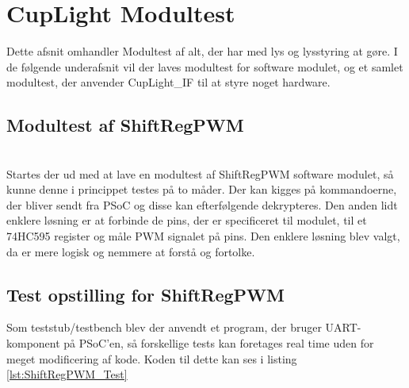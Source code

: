 \documentclass[Modultest/Modultest_main.tex]{subfiles}
\begin{document}

\lstset{escapechar=@,style=customc}

\section{CupLight Modultest}
\begin{table}[H]
\centering
{}
\caption{Versions Historik}
\label{process_version}
\end{table}

Dette afsnit omhandler Modultest af alt, der har med lys og lysstyring at gøre. I de følgende underafsnit vil der laves modultest for software modulet, og et samlet modultest, der anvender CupLight\_IF til at styre noget hardware.
\subsection{Modultest af ShiftRegPWM}
\\Startes der ud med at lave en modultest af ShiftRegPWM software modulet, så kunne denne i princippet testes på to måder. Der kan kigges på kommandoerne, der bliver sendt fra PSoC og disse kan efterfølgende dekrypteres. Den anden lidt enklere løsning er at forbinde de pins, der er specificeret til modulet, til et 74HC595 register og måle PWM signalet på pins. Den enklere løsning blev valgt, da er mere logisk og nemmere at forstå og fortolke. 
\subsection{Test opstilling for ShiftRegPWM}
Som teststub/testbench blev der anvendt et program, der bruger UART-komponent på PSoC'en, så forskellige tests kan foretages real time uden for meget modificering af kode. Koden til dette kan ses i listing \ref{lst:ShiftRegPWM_Test}
\end{document}

